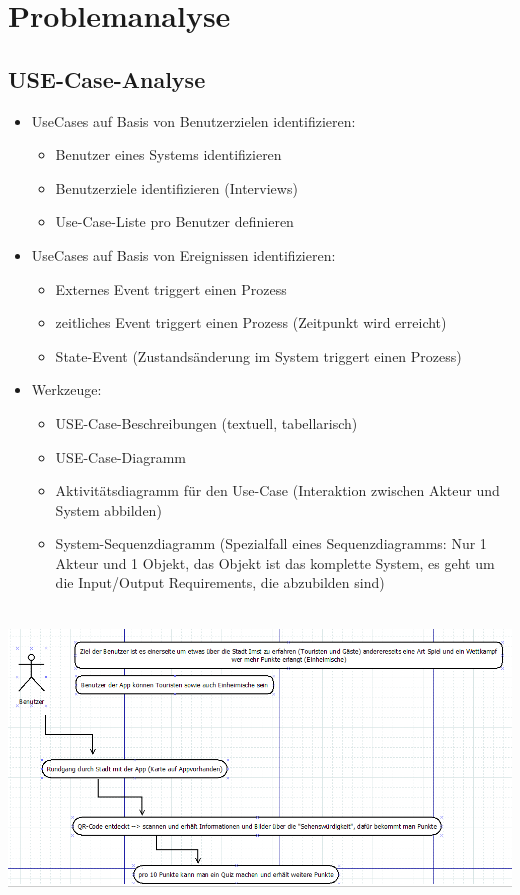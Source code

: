 \chapter{Problemanalyse}
\section{USE-Case-Analyse}
\begin{itemize}
	\item UseCases auf Basis von Benutzerzielen identifizieren: 
	\begin{itemize}
		\item Benutzer eines Systems identifizieren
		\item Benutzerziele identifizieren (Interviews)
		\item Use-Case-Liste pro Benutzer definieren
	\end{itemize}
	\item UseCases auf Basis von Ereignissen identifizieren: 
	\begin{itemize}
		\item Externes Event triggert einen Prozess
		\item zeitliches Event triggert einen Prozess (Zeitpunkt wird erreicht) 
		\item State-Event (Zustandsänderung im System triggert einen Prozess)
	\end{itemize}
	\item Werkzeuge:
	\begin{itemize}
		\item USE-Case-Beschreibungen (textuell, tabellarisch)
		\item USE-Case-Diagramm
		\item Aktivitätsdiagramm für den Use-Case (Interaktion zwischen Akteur und System abbilden)
		\item System-Sequenzdiagramm (Spezialfall eines Sequenzdiagramms: Nur 1 Akteur und 1 Objekt, das Objekt ist das komplette System, es geht um die Input/Output Requirements, die abzubilden sind)
	\end{itemize}
\end{itemize}

\includegraphics[height=8cm]{usecase}

